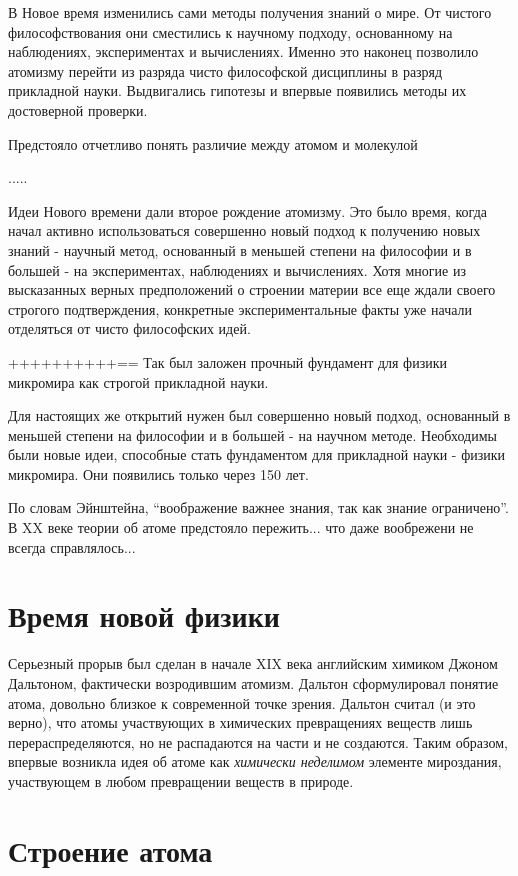 В Новое время изменились сами методы получения знаний о мире.
От чистого философствования они сместились к научному подходу, основанному на наблюдениях, экспериментах и вычислениях.
Именно это наконец позволило атомизму перейти из разряда чисто философской дисциплины в разряд прикладной науки. Выдвигались гипотезы и впервые появились методы их достоверной проверки.

Предстояло отчетливо понять различие между атомом и молекулой

.....



Идеи Нового времени дали второе рождение атомизму.
Это было время, когда начал активно использоваться совершенно новый подход к получению новых знаний - научный метод, основанный в меньшей степени на философии и в большей - на экспериментах, наблюдениях и вычислениях.
Хотя многие из высказанных верных предположений о строении материи все еще ждали своего строгого подтверждения, конкретные экспериментальные факты уже начали отделяться от чисто философских идей.

++++++++++==
Так был заложен прочный фундамент для физики микромира как строгой прикладной науки. 


Для настоящих же открытий нужен был совершенно новый подход, основанный в меньшей степени на философии и в большей - на научном методе. 
Необходимы были новые идеи, способные стать фундаментом для прикладной науки - физики микромира. 
Они появились только через 150 лет.

По словам Эйнштейна, ``воображение важнее знания, так как знание ограничено''.
В XX веке теории об атоме предстояло пережить... что даже вообрежени не всегда справлялось...


\section*{Время новой физики}

Серьезный прорыв был сделан в начале XIX века английским химиком Джоном Дальтоном, фактически возродившим атомизм. 
Дальтон сформулировал понятие атома, довольно близкое к современной точке зрения. 
Дальтон считал (и это верно), что атомы участвующих в химических превращениях веществ лишь перераспределяются, но не распадаются на части и не создаются. 
Таким образом, впервые возникла идея об атоме как \textit{химически неделимом} элементе мироздания, участвующем в любом превращении веществ в природе.


\section*{Строение атома}


